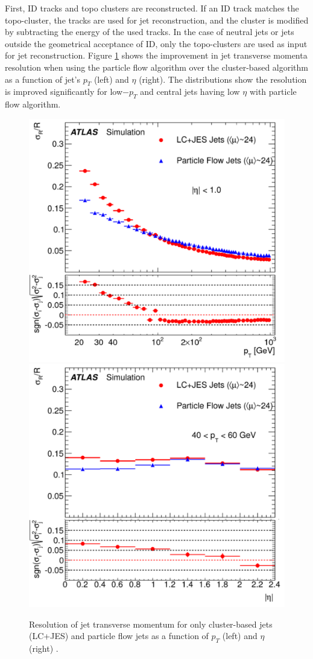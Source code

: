 First, ID tracks and topo clusters are reconstructed. If an ID track matches the topo-cluster, the tracks are used for jet reconstruction, and the cluster is modified by subtracting the energy of the used tracks. In the case of neutral jets or jets outside the geometrical acceptance of ID, only the topo-clusters are used as input for jet reconstruction. Figure \ref{fig:PflowvsCalo} shows the improvement in jet transverse momenta resolution when using the particle flow algorithm over the cluster-based algorithm as a function of jet's $p_{T}$ (left) and $\eta$ (right). The distributions show the resolution is improved significantly for low$-p_{T}$ and central jets having low $\eta$ with particle flow algorithm.

\begin{figure}[!htb]
    \centering
    \includegraphics[width=.48\linewidth]{figures/LHC/Pflow_vs_Calo_pt.pdf}
    \includegraphics[width=.48\linewidth]{figures/LHC/Pflow_vs_Calo_eta.pdf}
    \caption{ Resolution of jet transverse momentum for only cluster-based jets (LC+JES) and particle flow jets as a function of $p_{T}$ (left) and $\eta$ (right) \cite{ParticleFlow}.\label{fig:PflowvsCalo}}
\end{figure}

